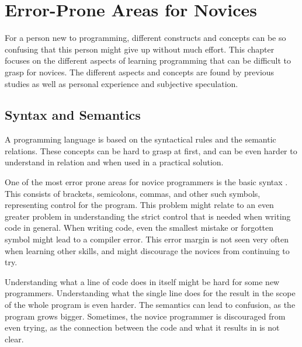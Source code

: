 \chapter{Error-Prone Areas for Novices}
\label{chap:error-prone_areas_for_novices}
For a person new to programming, different constructs and concepts can be so confusing that this person might give up without much effort. This chapter focuses on the different aspects of learning programming that can be difficult to grasp for novices. The different aspects and concepts are found by previous studies as well as personal experience and subjective speculation.

\section{Syntax and Semantics}
A programming language is based on the syntactical rules and the semantic relations. These concepts can be hard to grasp at first, and can be even harder to understand in relation and when used in a practical solution.

One of the most error prone areas for novice programmers is the basic syntax \cite{Garner05}. This consists of brackets, semicolons, commas, and other such symbols, representing control for the program. This problem might relate to an even greater problem in understanding the strict control that is needed when writing code in general. When writing code, even the smallest mistake or forgotten symbol might lead to a compiler error. This error margin is not seen very often when learning other skills, and might discourage the novices from continuing to try.

Understanding what a line of code does in itself might be hard for some new programmers. Understanding what the single line does for the result in the scope of the whole program is even harder. The semantics can lead to confusion, as the program grows bigger. Sometimes, the novice programmer is discouraged from even trying, as the connection between the code and what it results in is not clear.

